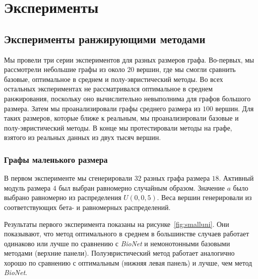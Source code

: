 \chapter{Эксперименты}





\section{Эксперименты ранжирующими методами}
\label{sec_experiments}

Мы провели три серии экспериментов для разных размеров графа.  Во-первых, мы
рассмотрели небольшие графы из около $20$ вершин, где мы смогли сравнить базовые,
оптимальное в среднем и полу-эвристический методы.  Во всех остальных
экспериментах не рассматривался оптимальное в среднем ранжирования, поскольку
оно вычислительно невыполнима для графов большого размера.  Затем мы
проанализировали графы среднего размера из $100$ вершин.  Для таких размеров,
которые ближе к реальным, мы проанализировали базовые и полу-эвристический
методы.  В конце мы протестировали методы на графе, взятого из реальных данных
из двух тысяч вершин.





\subsection{Графы маленького размера}

В первом эксперименте мы сгенерировали $32$ разных графа размера $18$.
Активный модуль размера $4$ был выбран равномерно случайным образом.  Значение
$a$ было выбрано равномерно из распределения $U(0, 0,5)$.  Веса вершин
генерировали из соответствующих бета- и равномерных распределений.

Результаты первого эксперимента показаны на рисунке~\ref{fig:smalluni}.  Они
показывают, что метод оптимального в среднем в большинстве случаев работает
одинаково или лучше по сравнению с \emph{BioNet} и немонотонными базовыми
методами (верхние панели).  Полуэвристический метод работает аналогично хорошо
по сравнению с оптимальным (нижняя левая панель) и лучше, чем метод
\emph{BioNet}.

